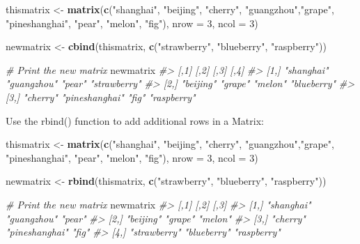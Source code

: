 \documentclass[
]{book}
\newenvironment{Shaded}{\begin{snugshade}}{\end{snugshade}}
\newcommand{\AttributeTok}[1]{\textcolor[rgb]{0.13,0.29,0.53}{#1}}
\newcommand{\CommentTok}[1]{\textcolor[rgb]{0.56,0.35,0.01}{\textit{#1}}}
\newcommand{\DecValTok}[1]{\textcolor[rgb]{0.00,0.00,0.81}{#1}}
\newcommand{\FunctionTok}[1]{\textcolor[rgb]{0.13,0.29,0.53}{\textbf{#1}}}
\newcommand{\NormalTok}[1]{#1}
\newcommand{\OtherTok}[1]{\textcolor[rgb]{0.56,0.35,0.01}{#1}}
\newcommand{\StringTok}[1]{\textcolor[rgb]{0.31,0.60,0.02}{#1}}
\begin{document}
\begin{Shaded}
\begin{Highlighting}[]
\NormalTok{thismatrix }\OtherTok{\textless{}{-}} \FunctionTok{matrix}\NormalTok{(}\FunctionTok{c}\NormalTok{(}\StringTok{"shanghai"}\NormalTok{, }\StringTok{"beijing"}\NormalTok{, }\StringTok{"cherry"}\NormalTok{, }\StringTok{"guangzhou"}\NormalTok{,}\StringTok{"grape"}\NormalTok{, }\StringTok{"pineshanghai"}\NormalTok{, }\StringTok{"pear"}\NormalTok{, }\StringTok{"melon"}\NormalTok{, }\StringTok{"fig"}\NormalTok{), }\AttributeTok{nrow =} \DecValTok{3}\NormalTok{, }\AttributeTok{ncol =} \DecValTok{3}\NormalTok{)}

\NormalTok{newmatrix }\OtherTok{\textless{}{-}} \FunctionTok{cbind}\NormalTok{(thismatrix, }\FunctionTok{c}\NormalTok{(}\StringTok{"strawberry"}\NormalTok{, }\StringTok{"blueberry"}\NormalTok{, }\StringTok{"raspberry"}\NormalTok{))}

\CommentTok{\# Print the new matrix}
\NormalTok{newmatrix}
\CommentTok{\#\textgreater{}      [,1]       [,2]           [,3]    [,4]        }
\CommentTok{\#\textgreater{} [1,] "shanghai" "guangzhou"    "pear"  "strawberry"}
\CommentTok{\#\textgreater{} [2,] "beijing"  "grape"        "melon" "blueberry" }
\CommentTok{\#\textgreater{} [3,] "cherry"   "pineshanghai" "fig"   "raspberry"}
\end{Highlighting}
\end{Shaded}

Use the rbind() function to add additional rows in a Matrix:

\begin{Shaded}
\begin{Highlighting}[]
\NormalTok{thismatrix }\OtherTok{\textless{}{-}} \FunctionTok{matrix}\NormalTok{(}\FunctionTok{c}\NormalTok{(}\StringTok{"shanghai"}\NormalTok{, }\StringTok{"beijing"}\NormalTok{, }\StringTok{"cherry"}\NormalTok{, }\StringTok{"guangzhou"}\NormalTok{,}\StringTok{"grape"}\NormalTok{, }\StringTok{"pineshanghai"}\NormalTok{, }\StringTok{"pear"}\NormalTok{, }\StringTok{"melon"}\NormalTok{, }\StringTok{"fig"}\NormalTok{), }\AttributeTok{nrow =} \DecValTok{3}\NormalTok{, }\AttributeTok{ncol =} \DecValTok{3}\NormalTok{)}

\NormalTok{newmatrix }\OtherTok{\textless{}{-}} \FunctionTok{rbind}\NormalTok{(thismatrix, }\FunctionTok{c}\NormalTok{(}\StringTok{"strawberry"}\NormalTok{, }\StringTok{"blueberry"}\NormalTok{, }\StringTok{"raspberry"}\NormalTok{))}

\CommentTok{\# Print the new matrix}
\NormalTok{newmatrix}
\CommentTok{\#\textgreater{}      [,1]         [,2]           [,3]       }
\CommentTok{\#\textgreater{} [1,] "shanghai"   "guangzhou"    "pear"     }
\CommentTok{\#\textgreater{} [2,] "beijing"    "grape"        "melon"    }
\CommentTok{\#\textgreater{} [3,] "cherry"     "pineshanghai" "fig"      }
\CommentTok{\#\textgreater{} [4,] "strawberry" "blueberry"    "raspberry"}
\end{Highlighting}
\end{Shaded}
\end{document}
